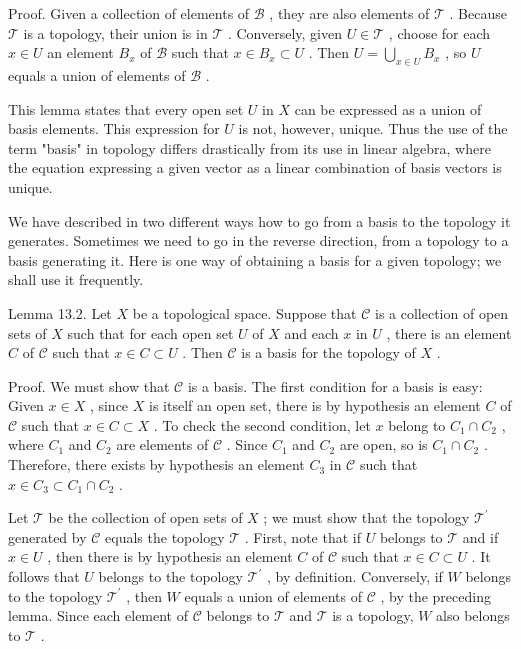 Proof. Given a collection of elements of \(\mathcal{B}\) , they are also elements of \(\mathcal{T}\) . Because \(\mathcal{T}\) is a topology, their union is in \(\mathcal{T}\) . Conversely, given \(U \in  \mathcal{T}\) , choose for each \(x \in  U\) an element \({B}_{x}\) of \(\mathcal{B}\) such that \(x \in  {B}_{x} \subset  U\) . Then \(U = \mathop{\bigcup }\limits_{{x \in  U}}{B}_{x}\) , so \(U\) equals a union of elements of \(\mathcal{B}\) .

This lemma states that every open set \(U\) in \(X\) can be expressed as a union of basis elements. This expression for \(U\) is not, however, unique. Thus the use of the term "basis" in topology differs drastically from its use in linear algebra, where the equation expressing a given vector as a linear combination of basis vectors is unique.

We have described in two different ways how to go from a basis to the topology it generates. Sometimes we need to go in the reverse direction, from a topology to a basis generating it. Here is one way of obtaining a basis for a given topology; we shall use it frequently.

Lemma 13.2. Let \(X\) be a topological space. Suppose that \(\mathcal{C}\) is a collection of open sets of \(X\) such that for each open set \(U\) of \(X\) and each \(x\) in \(U\) , there is an element \(C\) of \(\mathcal{C}\) such that \(x \in  C \subset  U\) . Then \(\mathcal{C}\) is a basis for the topology of \(X\) .

Proof. We must show that \(\mathcal{C}\) is a basis. The first condition for a basis is easy: Given \(x \in  X\) , since \(X\) is itself an open set, there is by hypothesis an element \(C\) of \(\mathcal{C}\) such that \(x \in  C \subset  X\) . To check the second condition, let \(x\) belong to \({C}_{1} \cap  {C}_{2}\) , where \({C}_{1}\) and \({C}_{2}\) are elements of \(\mathcal{C}\) . Since \({C}_{1}\) and \({C}_{2}\) are open, so is \({C}_{1} \cap  {C}_{2}\) . Therefore, there exists by hypothesis an element \({C}_{3}\) in \(\mathcal{C}\) such that \(x \in  {C}_{3} \subset  {C}_{1} \cap  {C}_{2}\) .

Let \(\mathcal{T}\) be the collection of open sets of \(X\) ; we must show that the topology \({\mathcal{T}}^{\prime }\) generated by \(\mathcal{C}\) equals the topology \(\mathcal{T}\) . First, note that if \(U\) belongs to \(\mathcal{T}\) and if \(x \in  U\) , then there is by hypothesis an element \(C\) of \(\mathcal{C}\) such that \(x \in  C \subset  U\) . It follows that \(U\) belongs to the topology \({\mathcal{T}}^{\prime }\) , by definition. Conversely, if \(W\) belongs to the topology \({\mathcal{T}}^{\prime }\) , then \(W\) equals a union of elements of \(\mathcal{C}\) , by the preceding lemma. Since each element of \(\mathcal{C}\) belongs to \(\mathcal{T}\) and \(\mathcal{T}\) is a topology, \(W\) also belongs to \(\mathcal{T}\) .

